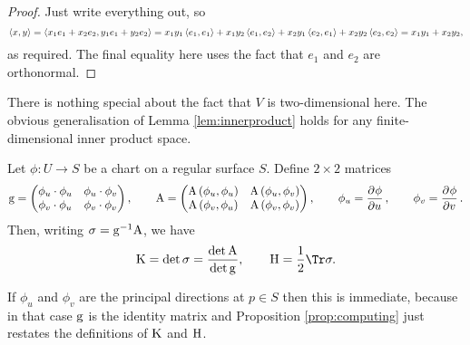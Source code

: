 \begin{proof}
Just write everything out, so
$$ \left\langle x, y \right\rangle = \left\langle x_1e_1 + x_2e_2, y_1e_1 + y_2e_2 \right\rangle = x_1y_1\left\langle e_1, e_1 \right\rangle + x_1y_2\left\langle e_1, e_2 \right\rangle + x_2y_1\left\langle e_2, e_1 \right\rangle + x_2y_2\left\langle e_2, e_2 \right\rangle = x_1y_1 + x_2y_2, $$
as required. The final equality here uses the fact that $ e_1 $ and $ e_2 $ are orthonormal.
\end{proof}

\begin{remark*}
There is nothing special about the fact that $ V $ is two-dimensional here. The obvious generalisation of Lemma \ref{lem:innerproduct} holds for any finite-dimensional inner product space.
\end{remark*}

\begin{proposition}
\label{prop:computing}
Let $ \phi : U \to S $ be a chart on a regular surface $ S $. Define $ 2 \times 2 $ matrices
$$ \g = \twobytwo{\phi_u \cdot \phi_u}{\phi_u \cdot \phi_v}{\phi_v \cdot \phi_u}{\phi_v \cdot \phi_v}, \qquad \A = \twobytwo{\A\br{\phi_u, \phi_u}}{\A\br{\phi_u, \phi_v}}{\A\br{\phi_v, \phi_u}}{\A\br{\phi_v, \phi_v}}, \qquad \phi_u = \dpd{\phi}{u}, \qquad \phi_v = \dpd{\phi}{v}. $$
Then, writing $ \sigma = \mathrm{g}^{-1}\mathrm{A} $, we have
$$ \K = \det \sigma = \dfrac{\det \A}{\det \g}, \qquad \H = \dfrac{1}{2}\Tr \sigma. $$
\end{proposition}

\begin{remark*}
If $ \phi_u $ and $ \phi_v $ are the principal directions at $ p \in S $ then this is immediate, because in that case $ \mathrm{g} $ is the identity matrix and Proposition \ref{prop:computing} just restates the definitions of $ \mathrm{K} $ and $ \mathrm{H} $.
\end{remark*}

\pagebreak

